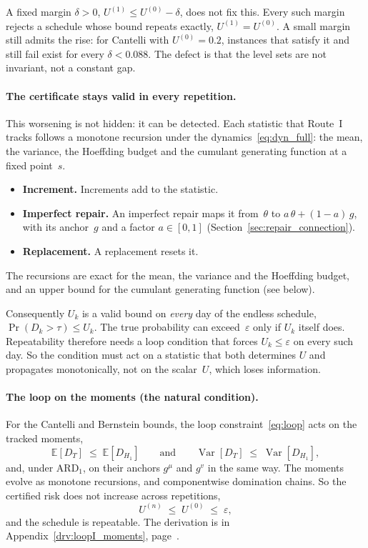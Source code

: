 \documentclass[11pt,a4paper]{article}
\theoremstyle{plain}
\theoremstyle{definition}
\theoremstyle{remark}
\begin{document}
A fixed margin $\delta > 0$, $U^{(1)} \le U^{(0)} - \delta$, does not fix this.
Every such margin rejects a schedule whose bound repeats exactly, $U^{(1)} = U^{(0)}$.
A small margin still admits the rise: for Cantelli with $U^{(0)} = 0.2$, instances that satisfy it and still fail exist for every $\delta < 0.088$.
The defect is that the level sets are not invariant, not a constant gap.

\paragraph{The certificate stays valid in every repetition.}
This worsening is not hidden: it can be detected.
Each statistic that Route~I tracks follows a monotone recursion under the dynamics~\eqref{eq:dyn_full}: the mean, the variance, the Hoeffding budget and the cumulant generating function at a fixed point~$s$.
\begin{itemize}
  \item \textbf{Increment.} Increments add to the statistic.
  \item \textbf{Imperfect repair.} An imperfect repair maps it from~$\theta$ to $a\,\theta + (1-a)\,g$, with its anchor~$g$ and a factor $a \in [0,1]$ (Section~\ref{sec:repair_connection}).
  \item \textbf{Replacement.} A replacement resets it.
\end{itemize}
The recursions are exact for the mean, the variance and the Hoeffding budget, and an upper bound for the cumulant generating function (see below).

Consequently $U_k$ is a valid bound on \emph{every} day of the endless schedule, $\Pr(D_k > \tau) \le U_k$.
The true probability can exceed~$\varepsilon$ only if $U_k$ itself does.
Repeatability therefore needs a loop condition that forces $U_k \le \varepsilon$ on every such day.
So the condition must act on a statistic that both determines $U$ and propagates monotonically, not on the scalar~$U$, which loses information.

\paragraph{The loop on the moments (the natural condition).}
For the Cantelli and Bernstein bounds, the loop constraint~\eqref{eq:loop} acts on the tracked moments,
\begin{equation}\label{eq:loop_moments}
  \mathbb{E}[D_T] \;\le\; \mathbb{E}[D_{H_1}]
  \qquad\text{and}\qquad
  \operatorname{Var}[D_T] \;\le\; \operatorname{Var}[D_{H_1}],
\end{equation}
and, under $\text{ARD}_1$, on their anchors $g^{\mu}$ and $g^{v}$ in the same way.
The moments evolve as monotone recursions, and componentwise domination chains.
So the certified risk does not increase across repetitions,
\begin{equation}\label{eq:loopI_risk}
  U^{(n)} \;\le\; U^{(0)} \;\le\; \varepsilon,
\end{equation}
and the schedule is repeatable.
The derivation is in Appendix~\ref{drv:loopI_moments}, page~\pageref{drv:loopI_moments}.
\end{document}
